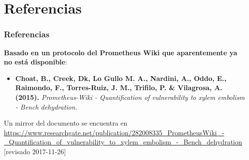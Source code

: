 \documentclass[usepdftitle=false]{beamer}
\newcommand{\Blue}[1]{{\color{blue!50!black}\textbf{#1}}}
\begin{document}
\section{Referencias}
\begin{frame}%
\frametitle{Referencias}\label{bib}

\Blue{Basado en un protocolo del Prometheus Wiki que aparentemente ya no está disponible}:

\begin{itemize}
   \item \textbf{Choat, B., Creek, Dk, Lo Gullo M. A., Nardini, A., Oddo, E.,  Raimondo, F., Torres-Ruiz, J. M., Trifilo, P. \& Vilagrosa, A. (2015).} \textit{Prometheus-Wiki - Quantification of vulnerability to xylem embolism - Bench dehydration.} 
\end{itemize}

Un mirror del documento se encuentra en  \url{https://www.researchgate.net/publication/282008335_PrometheusWiki_-_Quantification_of_vulnerability_to_xylem_embolism_-_Bench_dehydration} [revisado 2017-11-26]
\end{frame}
\end{document}
